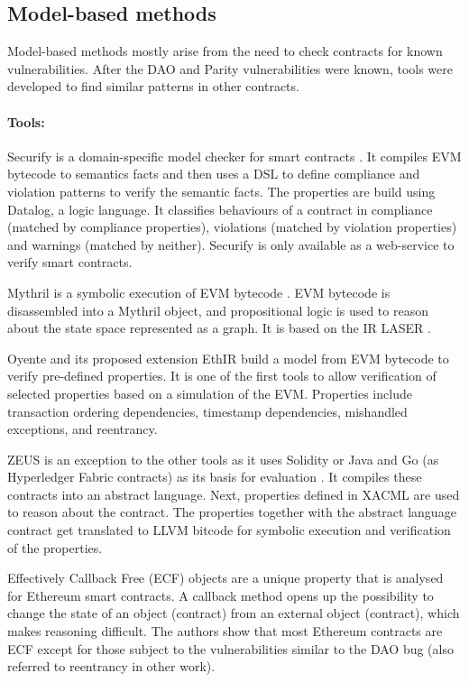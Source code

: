 


\subsection{Model-based methods}
Model-based methods mostly arise from the need to check contracts for known vulnerabilities. After the DAO and Parity vulnerabilities were known, tools were developed to find similar patterns in other contracts.

\paragraph{Tools:}
Securify is a domain-specific model checker for smart contracts \cite{Tsankov2017}. It compiles EVM bytecode to semantics facts and then uses a DSL to define compliance and violation patterns to verify the semantic facts. The properties are build using Datalog, a logic language. It classifies behaviours of a contract in compliance (matched by compliance properties), violations (matched by violation properties) and warnings (matched by neither). Securify is only available as a web-service to verify smart contracts.

Mythril is a symbolic execution of EVM bytecode \cite{Mueller2018}. EVM bytecode is disassembled into a Mythril object, and propositional logic is used to reason about the state space represented as a graph. It is based on the IR LASER \cite{Mueller2018LASER}.

Oyente \cite{Luu2016} and its proposed extension EthIR \cite{Albert2018} build a model from EVM bytecode to verify pre-defined properties. It is one of the first tools to allow verification of selected properties based on a simulation of the EVM. Properties include transaction ordering dependencies, timestamp dependencies, mishandled exceptions, and reentrancy.

ZEUS is an exception to the other tools as it uses Solidity or Java and Go (as Hyperledger Fabric contracts) as its basis for evaluation \cite{Kalra2018}. It compiles these contracts into an abstract language. Next, properties defined in XACML are used to reason about the contract. The properties together with the abstract language contract get translated to LLVM bitcode for symbolic execution and verification of the properties.

Effectively Callback Free (ECF) objects are a unique property that is analysed for Ethereum smart contracts\cite{Grossman2017}. A callback method opens up the possibility to change the state of an object (contract) from an external object (contract), which makes reasoning difficult. The authors show that most Ethereum contracts are ECF except for those subject to the vulnerabilities similar to the DAO bug (also referred to reentrancy in other work).

